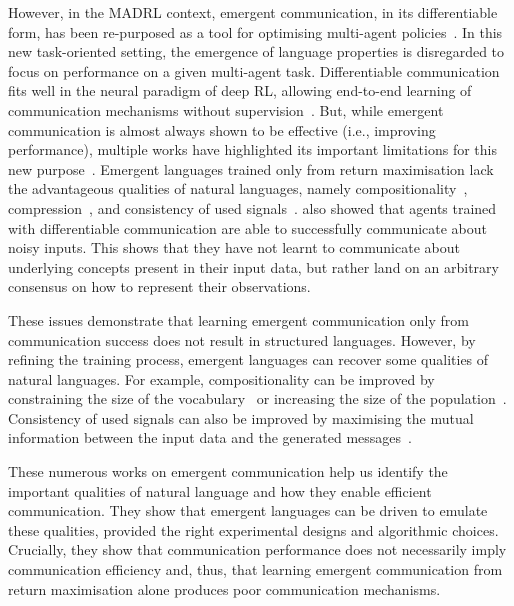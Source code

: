 However, in the MADRL context, emergent communication, in its differentiable form, has been re-purposed as a tool for optimising multi-agent policies~\citep{Zhu2024_MACSurvey}. In this new task-oriented setting, the emergence of language properties is disregarded to focus on performance on a given multi-agent task. Differentiable communication fits well in the neural paradigm of deep RL, allowing end-to-end learning of communication mechanisms without supervision~\citep{Foerster2016_DIAL, Sukhbaatar2016_CommNet, Mordatch2018_GroundedCompo, Jiang2018_ATOC, Jaques2019_SocialInfluence, Singh2019_IC3Net, Das2019_TarMAC, Kim2018_SchedNet, Zhang2019_VBC, Han2023_MBC}. But, while emergent communication is almost always shown to be effective (i.e., improving performance), multiple works have highlighted its important limitations for this new purpose~\citep{Kottur2017_NaturLangEmerg, Lazaridou2020_DeepEmergentComm}. Emergent languages trained only from return maximisation lack the advantageous qualities of natural languages, namely compositionality~\citep{Galke2022_Emergent}, compression~\citep{Chaabouni2019_AntiEfficient}, and consistency of used signals~\citep{Kottur2017_NaturLangEmerg}. 
\citet{Bouchacourt2018_HowAgentsSee} also showed that agents trained with differentiable communication are able to successfully communicate about noisy inputs. This shows that they have not learnt to communicate about underlying concepts present in their input data, but rather land on an arbitrary consensus on how to represent their observations. 

These issues demonstrate that learning emergent communication only from communication success does not result in structured languages. However, by refining the training process, emergent languages can recover some qualities of natural languages. For example, compositionality can be improved by constraining the size of the vocabulary~\citep{Mordatch2018_GroundedCompo} or increasing the size of the population~\citep{Chaabouni2022_EmCommScale, Rita2022_PopHetero}. Consistency of used signals can also be improved by maximising the mutual information between the input data and the generated messages~\citep{Eccles2019_EmCommBiases}. 

These numerous works on emergent communication help us identify the important qualities of natural language and how they enable efficient communication. They show that emergent languages can be driven to emulate these qualities, provided the right experimental designs and algorithmic choices. Crucially, they show that communication performance does not necessarily imply communication efficiency and, thus, that learning emergent communication from return maximisation alone produces poor communication mechanisms.  





